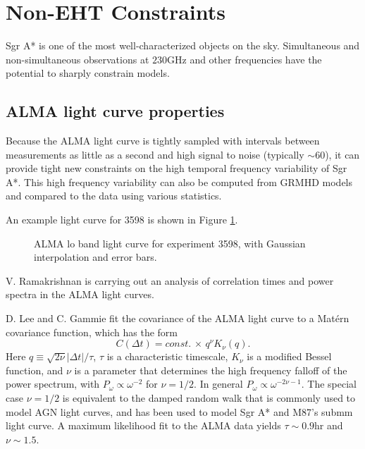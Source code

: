 \documentclass[twocolumn,tighten,dvipsnames]{aastex63}
\newcommand\<{{\langle}}
\renewcommand\>{{\rangle}} %
\begin{document}
\section{Non-EHT Constraints}

Sgr A* is one of the most well-characterized objects on the sky. Simultaneous and non-simultaneous observations at $230$GHz and  other frequencies have the potential to sharply constrain models.

\subsection{ALMA light curve properties}

Because the ALMA light curve is tightly sampled with intervals  between measurements as little as a second and high signal to noise (typically $\sim 60$), it can provide tight new constraints on the high temporal frequency variability of Sgr A*.  This high frequency variability can also be computed from GRMHD models and compared to the data using various statistics.

An example light curve for 3598 is shown in Figure \ref{fig:LC3598}.

\begin{figure}
    \centering
    \caption{ALMA lo band light curve for experiment 3598, with Gaussian interpolation and error bars.}
    \label{fig:LC3598}
\end{figure}

V. Ramakrishnan is carrying out an analysis of correlation times and power spectra in the ALMA light curves.

D. Lee and C. Gammie fit the covariance of the ALMA light curve to a Mat\'ern covariance function, which has the form
\begin{equation}
    C(\Delta t) = const. \, \times \, q^\nu K_\nu(q).
\end{equation}
Here $q \equiv \sqrt{2\nu} |\Delta t|/\tau$, $\tau$ is a characteristic timescale, $K_\nu$ is a modified Bessel function, and $\nu$ is a parameter that determines the high frequency falloff of the power spectrum, with $P_\omega \propto \omega^{-2}$ for $\nu = 1/2$.  In general $P_\omega \propto \omega^{-2\nu - 1}$. The special case $\nu = 1/2$ is equivalent to the damped random walk that is commonly used to model AGN light curves, and has been used to model Sgr A* and M87's submm light curve. A maximum likelihood fit to the ALMA data yields $\tau \sim 0.9$hr and $\nu \sim 1.5$.
\end{document}
